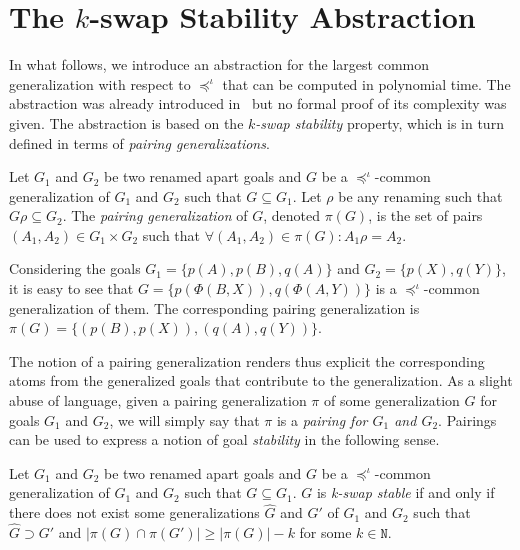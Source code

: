 \section{The $k$-swap Stability Abstraction}\label{section-relation-3}
In what follows, we introduce an abstraction for the largest common generalization with respect to $\preceq^\iota$ that can be computed in polynomial time. The abstraction was already introduced in~\cite{gen} but no formal proof of its complexity was given. The abstraction is based on the \textit{$k$-swap stability} property, which is in turn defined in terms of \textit{pairing generalizations}. 

\begin{definition}
	Let $G_1$ and $G_2$ be two renamed apart goals and $G$ be a $\preceq^\iota$-common generalization of $G_1$ and $G_2$ such that $G\subseteq G_1$. Let $\rho$ be any renaming such that $G\rho\subseteq G_2$. The \emph{pairing generalization} of $G$, denoted $\pi(G)$, is the set of pairs $(A_1, A_2) \in G_1\times G_2$ such that $\forall(A_1, A_2)\in\pi(G):A_1\rho = A_2$. 
\end{definition}

\begin{example}
	Considering the goals $G_1 = \{p(A), p(B), q(A)\}$ and $G_2 = \{p(X), q(Y)\}$, it is easy to see that $G = \{p(\Phi(B,X)), q(\Phi(A,Y))\}$ is a $\preceq^\iota$-common generalization of them. The corresponding pairing generalization is $\pi(G) = \{(p(B), p(X)), (q(A), q(Y))\}$.
\end{example} 

The notion of a pairing generalization renders thus explicit the corresponding atoms from the generalized goals that contribute to the generalization.
As a slight abuse of language, given a pairing generalization $\pi$ of some generalization $G$ for goals $G_1$ and $G_2$, we will simply say that $\pi$ is a \textit{pairing for $G_1$ and $G_2$}. 
Pairings can be used to express a notion of goal \textit{stability} in the following sense.

\begin{definition}\label{def-k-swap-stable}
	Let $G_1$ and $G_2$ be two renamed apart goals and $G$ be a $\preceq^\iota$-common generalization of $G_1$ and $G_2$ such that $G\subseteq G_1$. $G$ is \emph{k-swap stable} if and only if there does not exist some generalizations $\hat{G}$ and $G'$ of $G_1$ and $G_2$ such that $\hat{G}\supset G'$ and $|\pi(G)\cap\pi(G')|\ge |\pi(G)|-k$ for some $k\in\mathtt{N}$.
\end{definition}

